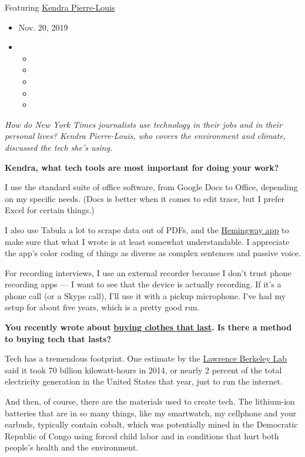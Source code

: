 Featuring
\href{https://www.nytimes3xbfgragh.onion/by/kendra-pierre-louis}{Kendra
Pierre-Louis}

\begin{itemize}
\item
  Nov. 20, 2019
\item
  \begin{itemize}
  \item
  \item
  \item
  \item
  \item
  \end{itemize}
\end{itemize}

\emph{How do New York Times journalists use technology in their jobs and
in their personal lives? Kendra Pierre-Louis, who covers the environment
and climate, discussed the tech she's using.}

\textbf{Kendra, what tech tools are most important for doing your work?}

I use the standard suite of office software, from Google Docs to Office,
depending on my specific needs. (Docs is better when it comes to edit
trace, but I prefer Excel for certain things.)

I also use Tabula a lot to scrape data out of PDFs, and the
\href{http://www.hemingwayapp.com/}{Hemingway app} to make sure that
what I wrote is at least somewhat understandable. I appreciate the app's
color coding of things as diverse as complex sentences and passive
voice.

For recording interviews, I use an external recorder because I don't
trust phone recording apps --- I want to see that the device is actually
recording. If it's a phone call (or a Skype call), I'll use it with a
pickup microphone. I've had my setup for about five years, which is a
pretty good run.

\textbf{You recently wrote about}
\textbf{\href{https://www.nytimes3xbfgragh.onion/interactive/2019/climate/sustainable-clothing.html}{buying
clothes that last}. Is there a method to buying tech that lasts?}

Tech has a tremendous footprint. One estimate by the
\href{https://eta.lbl.gov/publications/united-states-data-center-energy}{Lawrence
Berkeley Lab} said it took 70 billion kilowatt-hours in 2014, or nearly
2 percent of the total electricity generation in the United States that
year, just to run the internet.

And then, of course, there are the materials used to create tech. The
lithium-ion batteries that are in so many things, like my smartwatch, my
cellphone and your earbuds, typically contain cobalt, which was
potentially mined in the Democratic Republic of Congo using forced child
labor and in conditions that hurt both people's health and the
environment.

